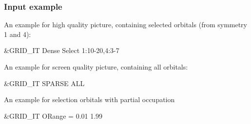 \subsubsection{Input example}
An example for high quality picture, containing selected orbitals (from symmetry 1 and 4):
\begin{inputlisting}
 &GRID_IT
Dense
Select
1:10-20,4:3-7
\end{inputlisting}

An example for screen quality picture, containing all orbitals:
\begin{inputlisting}
 &GRID_IT
SPARSE
ALL
\end{inputlisting}

An example for selection orbitals with partial occupation
\begin{inputlisting}
 &GRID_IT
ORange = 0.01 1.99
\end{inputlisting}
